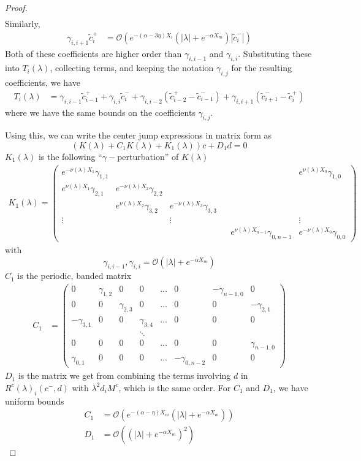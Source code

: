 \documentclass[thesis.tex]{subfiles}
\begin{document}
\begin{lemma}
\begin{proof}
\begin{align*}
\end{align*}
Similarly,
\begin{align*}
\gamma_{i,i+1} \tilde{c}_i^+ &= \mathcal{O}(e^{-(\alpha - 3 \eta) X_i}(|\lambda| + e^{-\alpha X_m})|\tilde{c}_i^-|)
\end{align*}
Both of these coefficients are higher order than $\gamma_{i,i-1}$ and $\gamma_{i,i}$. Substituting these into $T_i(\lambda)$, collecting terms, and keeping the notation $\gamma_{i,j}$ for the resulting coefficients, we have
\begin{align*}
T_i(\lambda) &= \gamma_{i,i-1} \tilde{c}_{i-1}^+ + \gamma_{i,i} \tilde{c}_{i}^- + \gamma_{i,i-2} ( \tilde{c}_{i-2}^+ - \tilde{c}_{i-1}^-) + \gamma_{i,i+1} (\tilde{c}_{i+1}^- - \tilde{c}_i^+)
\end{align*}
where we have the same bounds on the coefficients $\gamma_{i,j}$. 

Using this, we can write the center jump expressions in matrix form as
\[
(K(\lambda) + C_1 K(\lambda) + K_1(\lambda)) c + D_1 d = 0
\]
$K_1(\lambda)$ is the following ``$\gamma-$perturbation'' of $K(\lambda)$ 
\begin{align*}
K_1(\lambda) =  
\begin{pmatrix}
e^{-\nu(\lambda)X_1} \gamma_{1,1} & & & & & e^{\nu(\lambda)X_0}\gamma_{1,0} \\
e^{\nu(\lambda)X_1}\gamma_{2,1} & e^{-\nu(\lambda)X_2}\gamma_{2,2} \\
& e^{\nu(\lambda)X_2}\gamma_{3,2} & e^{-\nu(\lambda)X_3}\gamma_{3,3} \\
\vdots & & \vdots & &&  \vdots \\
& & & & e^{\nu(\lambda)X_{n-1}}\gamma_{0,n-1} & e^{-\nu(\lambda)X_0}\gamma_{0,0} 
\end{pmatrix}
\end{align*}
with 
\[
\gamma_{i,i-1}, \gamma_{i,i} = \mathcal{O}(|\lambda| + e^{-\alpha X_m})
\] 
$C_1$ is the periodic, banded matrix
\begin{align*}
C_1 &= \begin{pmatrix}
0 & \gamma_{1,2} & 0 & 0 & \dots & 0 & -\gamma_{n-1,0} & 0 \\
0 & 0 & \gamma_{2,3} & 0 & \dots & 0 & 0 & -\gamma_{2,1} \\
-\gamma_{3,1} & 0 & 0 & \gamma_{3,4} & \dots & 0 & 0 & 0 \\
&  & & \ddots  \\
0 & 0 & 0 & 0 & \dots & 0 & 0 & \gamma_{n-1,0} \\
\gamma_{0,1} & 0 & 0 & 0 & \dots & -\gamma_{0, n-2} & 0 & 0 
\end{pmatrix}
\end{align*}
$D_1$ is the matrix we get from combining the terms involving $d$ in $R^c(\lambda)_i(c^-, d)$ with $\lambda^2 d_i M^c$, which is the same order. For $C_1$ and $D_1$, we have uniform bounds
\begin{align*}
C_1 &= \mathcal{O}(e^{-(\alpha - \eta) X_m}(|\lambda| + e^{-\alpha X_m})) \\
D_1 &= \mathcal{O}((|\lambda| + e^{-\alpha X_m})^2)
\end{align*}
\end{proof}
\end{lemma}
\end{document}
